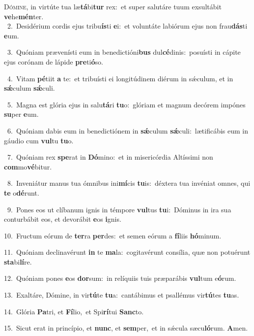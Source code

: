 \lettrine{\initial\textcolor{\initialcolor}{D}}{ómine,} in virtúte tua læ\-\textbf{tá}\-bi\textbf{tur} rex:~\star et super salutáre tuum exsultábit \textbf{ve}\-he\-\textbf{mén}\-ter.\\
{\numbfont\textcolor{\numbcolor}{~2.}}~Desidérium cordis ejus tribu\-\textbf{ís}\-ti \textbf{e}\-i:~\star et voluntáte labiórum ejus non frau\-\textbf{dás}\-ti \textbf{e}\-um.\par
{\numbfont\textcolor{\numbcolor}{~3.}}~Quóniam prævenísti eum in benedictióni\textbf{bus} dul\-\textbf{cé}\-dinis:~\star posuísti in cápite ejus corónam de lápide \textbf{pre}\-ti\-\textbf{ó}\-so.\par
{\numbfont\textcolor{\numbcolor}{~4.}}~Vitam \textbf{pé}\-tiit \textbf{a} te:~\star et tribuísti ei longitúdinem diérum in sǽculum, et in \textbf{sǽ}\-culum \textbf{sǽ}\-culi.\par
{\numbfont\textcolor{\numbcolor}{~5.}}~Magna est glória ejus in salu\-\textbf{tá}\-ri \textbf{tu}\-o:~\star glóriam et magnum decórem impónes \textbf{su}\-per \textbf{e}\-um.\par
{\numbfont\textcolor{\numbcolor}{~6.}}~Quóniam dabis eum in benedictiónem in \textbf{sǽ}\-culum \textbf{sǽ}\-culi:~\star lætificábis eum in gáudio cum \textbf{vul}\-tu \textbf{tu}\-o.\par
{\numbfont\textcolor{\numbcolor}{~7.}}~Quóniam rex \textbf{spe}\-rat in \textbf{Dó}\-mino:~\star et in misericórdia Altíssimi non \textbf{com}\-mo\-\textbf{vé}\-bitur.\par
{\numbfont\textcolor{\numbcolor}{~8.}}~Inveniátur manus tua ómnibus ini\-\textbf{mí}\-cis \textbf{tu}\-is:~\star déxtera tua invéniat omnes, qui \textbf{te} o\-\textbf{dé}\-runt.\par
{\numbfont\textcolor{\numbcolor}{~9.}}~Pones eos ut clíbanum ignis in témpore \textbf{vul}\-tus \textbf{tu}\-i:~\star Dóminus in ira sua conturbábit eos, et devorábit \textbf{e}\-os \textbf{i}\-gnis.\par
{\numbfont\textcolor{\numbcolor}{10.}}~Fructum eórum de \textbf{ter}\-ra \textbf{per}\-des:~\star et semen eórum a \textbf{fí}\-liis \textbf{hó}\-minum.\par
{\numbfont\textcolor{\numbcolor}{11.}}~Quóniam declinavérunt \textbf{in} te \textbf{ma}\-la:~\star cogitavérunt consília, quæ non potuérunt \textbf{sta}\-bi\-\textbf{lí}\-re.\par
{\numbfont\textcolor{\numbcolor}{12.}}~Quóniam pones \textbf{e}\-os \textbf{dor}\-sum:~\star in relíquiis tuis præparábis \textbf{vul}\-tum e\-\textbf{ó}\-rum.\par
{\numbfont\textcolor{\numbcolor}{13.}}~Exaltáre, Dómine, in vir\-\textbf{tú}\-te \textbf{tu}\-a:~\star cantábimus et psallémus vir\-\textbf{tú}\-tes \textbf{tu}\-as.\par
{\numbfont\textcolor{\numbcolor}{14.}}~Glória \textbf{Pa}\-tri, et \textbf{Fí}\-lio,~\star et Spi\-\textbf{rí}\-tui \textbf{Sanc}\-to.\par
{\numbfont\textcolor{\numbcolor}{15.}}~Sicut erat in princípio, et \textbf{nunc}\-, et \textbf{sem}\-per,~\star et in sǽcula sæcu\-\textbf{ló}\-rum. \textbf{A}\-men.\par
